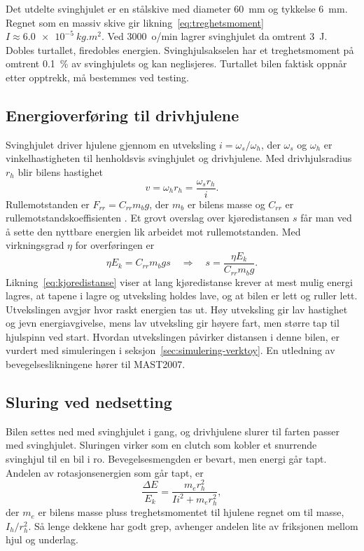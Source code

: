 Det utdelte svinghjulet er en stålskive med diameter \SI{60}{mm} og tykkelse \SI{6}{mm}. Regnet som en massiv skive gir likning~\eqref{eq:treghetsmoment} $I \approx \SI{6,0e-5}{kg.m^2}$. Ved \SI{3000}{o/min} lagrer svinghjulet da omtrent \SI{3}{J}. Dobles turtallet, firedobles energien. Svinghjulsakselen har et treghetsmoment på omtrent \SI{0,1}{\percent} av svinghjulets og kan neglisjeres. Turtallet bilen faktisk oppnår etter opptrekk, må bestemmes ved testing.

\subsection{Energioverføring til drivhjulene}
Svinghjulet driver hjulene gjennom en utveksling $i = \omega_s / \omega_h$, der $\omega_s$ og $\omega_h$ er vinkelhastigheten til henholdsvis svinghjulet og drivhjulene. Med drivhjulsradius $r_h$ blir bilens hastighet \parencite{harkegaard_2004}
\begin{equation}
    v = \omega_h r_h = \frac{\omega_s r_h}{i} .
    \label{eq:hastighet}
\end{equation}
Rullemotstanden er $F_{rr} = C_{rr} m_b g$, der $m_b$ er bilens masse og $C_{rr}$ er rullemotstandskoeffisienten \parencite{engineeringtoolbox_rolling}. Et grovt overslag over kjøredistansen $s$ får man ved å sette den nyttbare energien lik arbeidet mot rullemotstanden. Med virkningsgrad $\eta$ for overføringen er
\begin{equation}
    \eta E_k = C_{rr} m_b g s \quad \Rightarrow \quad s = \frac{\eta E_k}{C_{rr} m_b g} .
    \label{eq:kjoredistanse}
\end{equation}
Likning~\eqref{eq:kjoredistanse} viser at lang kjøredistanse krever at mest mulig energi lagres, at tapene i lagre og utveksling holdes lave, og at bilen er lett og ruller lett. Utvekslingen avgjør hvor raskt energien tas ut. Høy utveksling gir lav hastighet og jevn energiavgivelse, mens lav utveksling gir høyere fart, men større tap til hjulspinn ved start. Hvordan utvekslingen påvirker distansen i denne bilen, er vurdert med simuleringen i seksjon~\ref{sec:simulering-verktoy}. En utledning av bevegelseslikningene hører til MAST2007.

\subsection{Sluring ved nedsetting}
\label{sec:teori-slur}
Bilen settes ned med svinghjulet i gang, og drivhjulene slurer til farten passer med svinghjulet. Sluringen virker som en clutch som kobler et snurrende svinghjul til en bil i ro. Bevegelsesmengden er bevart, men energi går tapt. Andelen av rotasjonsenergien som går tapt, er
\begin{equation}
    \frac{\Delta E}{E_k} = \frac{m_e r_h^2}{I i^2 + m_e r_h^2} ,
    \label{eq:sluretap}
\end{equation}
der $m_e$ er bilens masse pluss treghetsmomentet til hjulene regnet om til masse, $I_h/r_h^2$. Så lenge dekkene har godt grep, avhenger andelen lite av friksjonen mellom hjul og underlag.

